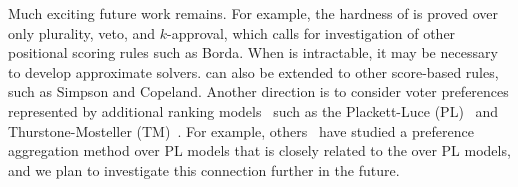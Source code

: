 Much exciting future work remains.  For example, the hardness of \esc is proved over only plurality, veto, and $k$-approval, which calls for investigation of other positional scoring rules such as Borda. When  \mew is intractable, it may be necessary to develop approximate solvers. \mew can also be extended to other score-based rules, such as Simpson and Copeland.
Another direction is to consider voter preferences represented by additional ranking models~\cite{marden1995analyzing} such as the Plackett-Luce (PL)~\cite{luce1959individual,plackett1975analysis} and  Thurstone-Mosteller (TM)~\cite{Thurstone1927-THUALO-2,RePEc:spr:psycho:v:16:y:1951:i:1:p:3-9}. For example, others~\cite{DBLP:conf/aaai/NoothigattuGADR18,DBLP:conf/uai/ZhaoLWKMSX18} have studied a preference aggregation method over PL models that is closely related to the \mew over PL models, and we plan to investigate this connection further in the future.